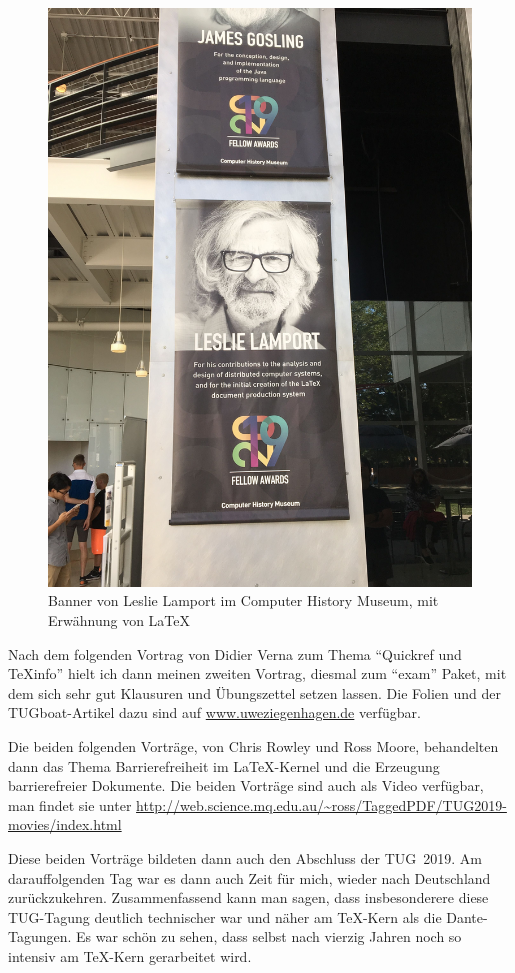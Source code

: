 \documentclass[ngerman]{dtk}
\begin{document}
\begin{figure}
\begin{center}
\includegraphics[height=0.8\textheight]{CHM}
\caption{Banner von Leslie Lamport im Computer History Museum, mit Erwähnung von \LaTeX}
\end{center}
\end{figure}

Nach dem folgenden Vortrag von Didier Verna zum Thema \enquote{Quickref und TeXinfo} hielt ich dann meinen zweiten Vortrag, diesmal zum \enquote{exam} Paket, mit dem sich sehr gut Klausuren und Übungszettel setzen lassen. Die Folien und der TUGboat-Artikel dazu sind auf \url{www.uweziegenhagen.de} verfügbar.

Die beiden folgenden Vorträge, von Chris Rowley und Ross Moore, behandelten dann das Thema Barrierefreiheit im \LaTeX-Kernel und die Erzeugung barrierefreier Dokumente. Die beiden Vorträge sind auch als Video verfügbar, man findet sie unter \url{http://web.science.mq.edu.au/~ross/TaggedPDF/TUG2019-movies/index.html}

Diese beiden Vorträge bildeten dann auch den Abschluss der TUG~2019. Am darauffolgenden Tag war es dann auch Zeit für mich, wieder nach Deutschland zurückzukehren. Zusammenfassend kann man sagen, dass insbesonderere diese TUG-Tagung deutlich technischer war und näher am \TeX-Kern als die Dante-Tagungen. Es war schön zu sehen, dass selbst nach vierzig Jahren noch so intensiv am \TeX-Kern gerarbeitet wird.
\end{document}
